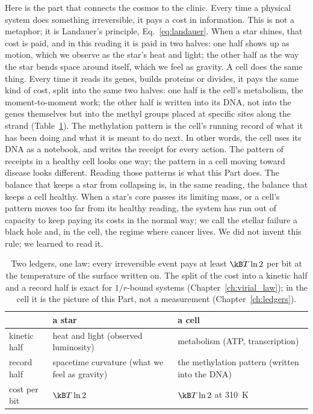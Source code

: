 Here is the part that connects the cosmos to the clinic. Every time a physical system does something irreversible, it pays a cost in
information. This is not a metaphor; it is Landauer's principle, Eq.~\eqref{eq:landauer}. \derived{} When a star shines, that cost is paid,
and in this reading it is paid in two halves: one half shows up as motion, which we observe as the star's heat and light; the other half as
the way the star bends space around itself, which we feel as gravity. A cell does the same thing. Every time it reads its genes, builds
proteins or divides, it pays the same kind of cost, split into the same two halves: one half is the cell's metabolism, the moment-to-moment
work; the other half is written into its DNA, not into the genes themselves but into the methyl groups placed at specific sites along the
strand (Table~\ref{tab:p4_twoledgers}). \conjecture{} The methylation pattern is the cell's running record of what it has been doing and
what it is meant to do next. In other words, the cell uses its DNA as a notebook, and writes the receipt for every action. The pattern of
receipts in a healthy cell looks one way; the pattern in a cell moving toward disease looks different. Reading those patterns is what this
Part does. \interp{} The balance that keeps a star from collapsing is, in the same reading, the balance that keeps a cell healthy. When a
star's core passes its limiting mass, or a cell's pattern moves too far from its healthy reading, the system has run out of capacity to
keep paying its costs in the normal way; we call the stellar failure a black hole and, in the cell, the regime where cancer lives. We did
not invent this rule; we learned to read it. \conjecture

\begin{table}[htbp]\centering\small
\caption{Two ledgers, one law: every irreversible event pays at least $\kB T\ln2$ per bit at the temperature of the surface written on. The split of
the cost into a kinetic half and a record half is exact for $1/r$-bound systems (Chapter~\ref{ch:virial_law}); in the cell it is the
picture of this Part, not a measurement (Chapter~\ref{ch:ledgers}). \conjecture}\label{tab:p4_twoledgers}
\begin{tabularx}{\linewidth}{@{}l>{\raggedright\arraybackslash}X>{\raggedright\arraybackslash}X@{}}\toprule
 & a star & a cell \\\midrule
kinetic half & heat and light (observed luminosity) & metabolism (ATP, transcription) \\
record half & spacetime curvature (what we feel as gravity) & the methylation pattern (written into the DNA) \\
cost per bit & $\kB T\ln2$ & $\kB T\ln2$ at 310~K \\\bottomrule
\end{tabularx}
\end{table}


